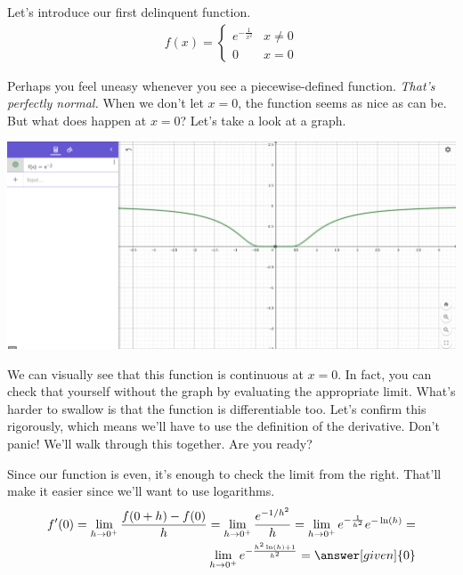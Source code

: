 \documentclass{ximera}
\begin{document}
\begin{exercise}
	
	Let's introduce our first delinquent function.
	\begin{align*}
		f(x)= 
		\begin{cases}
		e^{-\frac{1}{x^2}}  &x \neq 0 \\
		0 &x=0
		\end{cases}
	\end{align*}
	
	Perhaps you feel uneasy whenever you see a piecewise-defined function. \emph{That's perfectly normal.} When we don't let $x=0$, the function seems as nice as can be. But what does happen at $x=0$? Let's take a look at a graph.
	
	\begin{image}
		\includegraphics{graph.png}
	\end{image}
	
	We can visually see that this function is continuous at $x=0$. In fact, you can check that yourself without the graph by evaluating the appropriate limit. What's harder to swallow is that the function is differentiable too. Let's confirm this rigorously, which means we'll have to use the definition of the derivative. Don't panic! We'll walk through this together. Are you ready?
	\begin{multipleChoice}
	\end{multipleChoice}
	
	\begin{exercise}
		
		Since our function is even, it's enough to check the limit from the right. That'll make it easier since we'll want to use logarithms.
		\begin{align*}
			f'(0)= \lim_{h \to 0^+} \frac{f(0+h)-f(0)}{h} = \lim_{h \to 0^+} \frac{e^{-1/h^2}}{h} = \lim_{h \to 0^+} e^{-\frac{1}{h^2}}e^{-\ln(h)} = \\
			\lim_{h \to 0^+} e^{-\frac{h^2\ln(h)+1}{h^2}} = \answer[given]{0}
		\end{align*}
		

\end{exercise}
\end{exercise}
\end{document}
